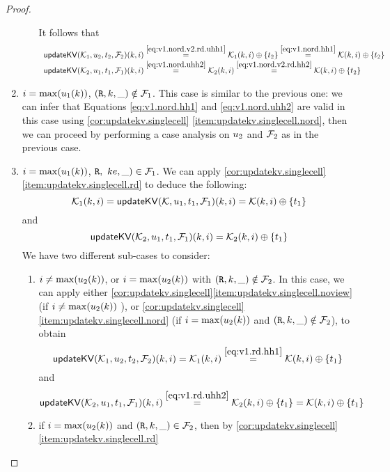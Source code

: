 \begin{proof}
\begin{enumerate}
\begin{enumerate}
\begin{equation}
\end{equation}
It follows that 
\[
\begin{array}{l}
\mathsf{updateKV}(\mathcal{K}_1, u_2, t_2, \mathcal{F}_2)(k, i) \stackrel{\eqref{eq:v1.nord.v2.rd.uhh1}}{=} \mathcal{K}_1(k, i) \oplus \{t_2 \} \stackrel{\eqref{eq:v1.nord.hh1}}{=} \mathcal{K}(k, i) \oplus \{t_2\}\\
\mathsf{updateKV}(\mathcal{K}_2,u_1, t_1,\mathcal{F}_1)(k, i) \stackrel{\eqref{eq:v1.nord.uhh2}}{=} \mathcal{K}_2(k, i) \stackrel{\eqref{eq:v1.nord.v2.rd.hh2}}{=} \mathcal{K}(k, i) \oplus \{t_2\}
\end{array}
\]
\end{enumerate}
\item $i = \max(u_1(k))$, $(\texttt{R}, k, \_) \notin \mathcal{F}_1$. This case is similar to the previous one: we can infer 
that Equations \eqref{eq:v1.nord.hh1} and \eqref{eq:v1.nord.uhh2} are valid in this case using \cref{cor:updatekv.singlecell}
\eqref{item:updatekv.singlecell.nord}, then we can proceed by performing a case analysis on $u_2$ and $\mathcal{F}_2$ as in the previous case.
\item $i = \max(u_1(k))$, $\texttt{R},\ ke, \_) \in \mathcal{F}_1$. We can apply \cref{cor:updatekv.singlecell}\eqref{item:updatekv.singlecell.rd} 
to deduce the following: 
\begin{equation}
\mathcal{K}_1(k, i) = \mathsf{updateKV}(\mathcal{K}, u_1, t_1, \mathcal{F}_1)(k, i) = \mathcal{K}(k, i) \oplus \{t_1\}
\label{eq:v1.rd.hh1}
\end{equation}
and
\begin{equation}
\mathsf{updateKV}(\mathcal{K}_2, u_1, t_1, \mathcal{F}_1)(k, i) = \mathcal{K}_2(k, i) \oplus \{t_1\}
\label{eq:v1.rd.uhh2}
\end{equation}
We have two different sub-cases to consider: 
\begin{enumerate}
\item $i \neq \max(u_2(k))$, or $i = \max(u_2(k))$ with $(\texttt{R},k,\_) \notin \mathcal{F}_2$. In this case, we can apply either 
\cref{cor:updatekv.singlecell}\eqref{item:updatekv.singlecell.noview} (if $i \neq \max(u_2(k))$ ), or 
\cref{cor:updatekv.singlecell} \eqref{item:updatekv.singlecell.nord} (if $i = \max(u_2(k))$ and $(\texttt{R}, k, \_) \notin \mathcal{F}_2$), 
to obtain 
\[
\mathsf{updateKV}(\mathcal{K}_1, u_2, t_2, \mathcal{F}_2)(k, i) = \mathcal{K}_1(k, i) \stackrel{\eqref{eq:v1.rd.hh1}}{=} \mathcal{K}(k, i) \oplus \{t_1\}
\]
and
\[
\mathsf{updateKV}(\mathcal{K}_2, u_1, t_1, \mathcal{F}_1)(k, i) \stackrel{\eqref{eq:v1.rd.uhh2}}{=} \mathcal{K}_2(k, i) \oplus \{ t_1 \} = 
\mathcal{K}(k, i) \oplus \{ t_1 \}
\]
\item if $i = \max(u_2(k))$ and $(\texttt{R}, k, \_) \in \mathcal{F}_2$, then by \cref{cor:updatekv.singlecell}\eqref{item:updatekv.singlecell.rd} 

\end{enumerate}
\end{enumerate}
\end{proof}
